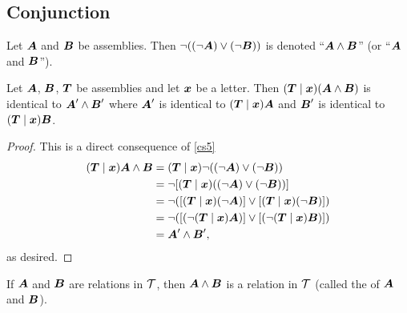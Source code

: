 \subsection{Conjunction}

\begin{definition}
Let $\boldsymbol{A}$ and $\boldsymbol{B}$ be assemblies. Then $\neg((\neg\boldsymbol{A})\lor(\neg\boldsymbol{B}))$
is denoted ``$\boldsymbol{A}\land\boldsymbol{B}$'' (or
``$\boldsymbol{A}$ and $\boldsymbol{B}$'').
\end{definition}

\begin{cs}\label{cs6}%
Let $\boldsymbol{A}$, $\boldsymbol{B}$, $\boldsymbol{T}$ be
assemblies and let $\boldsymbol{x}$ be a letter. Then $(\boldsymbol{T}\mid\boldsymbol{x})(\boldsymbol{A}\land\boldsymbol{B})$
is identical to $\boldsymbol{A}'\land\boldsymbol{B}'$ where
$\boldsymbol{A}'$ is identical to $(\boldsymbol{T}\mid\boldsymbol{x})\boldsymbol{A}$
and $\boldsymbol{B}'$ is identical to $(\boldsymbol{T}\mid\boldsymbol{x})\boldsymbol{B}$.
\end{cs}

\begin{proof}
This is a direct consequence of \ref{cs5}
\begin{subequations}
\begin{align}
(\boldsymbol{T}\mid\boldsymbol{x})\boldsymbol{A}\land\boldsymbol{B}
&=(\boldsymbol{T}\mid\boldsymbol{x})\neg((\neg\boldsymbol{A})\lor(\neg\boldsymbol{B}))\\
&=\neg[(\boldsymbol{T}\mid\boldsymbol{x})((\neg\boldsymbol{A})\lor(\neg\boldsymbol{B}))]\\
&=\neg([(\boldsymbol{T}\mid\boldsymbol{x})(\neg\boldsymbol{A})]\lor[(\boldsymbol{T}\mid\boldsymbol{x})(\neg\boldsymbol{B})])\\
&=\neg([(\neg(\boldsymbol{T}\mid\boldsymbol{x})\boldsymbol{A})]\lor[(\neg(\boldsymbol{T}\mid\boldsymbol{x})\boldsymbol{B})])\\
&=\boldsymbol{A}'\land\boldsymbol{B}',
\end{align}
\end{subequations}
as desired.
\end{proof}

\begin{cf}\label{cf9}%
If $\boldsymbol{A}$ and $\boldsymbol{B}$ are relations in $\mathcal{T}$,
then $\boldsymbol{A}\land\boldsymbol{B}$ is a relation in $\mathcal{T}$
(called the  of $\boldsymbol{A}$ and $\boldsymbol{B}$).
\end{cf}

